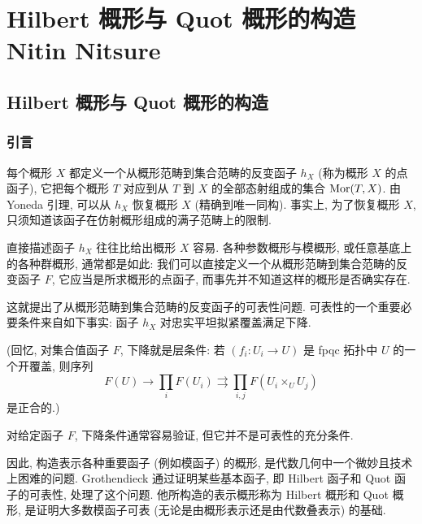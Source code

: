 \providecommand{\chHilb}{\mathcal{H}ilb}
\providecommand{\chQuot}{\mathcal{Q}uot}
\providecommand{\chGrass}{\mathcal{G}rass}
\providecommand{\chProj}{\operatorname{Proj}}
\providecommand{\chSym}{\operatorname{Sym}}
\providecommand{\chGrassScheme}{\operatorname{Grass}}
\providecommand{\chHilbScheme}{\operatorname{Hilb}}
\providecommand{\chQuotScheme}{\operatorname{Quot}}
\part[\parttoc{Hilbert 概形与 Quot 概形的构造}{Nitin Nitsure}]{%
%
Hilbert 概形与 Quot 概形的构造\\[1.5em]{\normalfont\normalsize Nitin Nitsure}}
\chapter{Hilbert 概形与 Quot 概形的构造}\label{ch05}
\section*{引言}
每个概形 $X$ 都定义一个从概形范畴到集合范畴的反变函子 $h_X$ (称为概形 $X$ 的点函子), 它把每个概形 $T$ 对应到从 $T$ 到 $X$ 的全部态射组成的集合 $\operatorname{Mor}(T,X)$. 由 Yoneda 引理, 可以从 $h_X$ 恢复概形 $X$ (精确到唯一同构). 事实上, 为了恢复概形 $X$, 只须知道该函子在仿射概形组成的满子范畴上的限制.

直接描述函子 $h_X$ 往往比给出概形 $X$ 容易. 各种参数概形与模概形, 或任意基底上的各种群概形, 通常都是如此: 我们可以直接定义一个从概形范畴到集合范畴的反变函子 $F$, 它应当是所求概形的点函子, 而事先并不知道这样的概形是否确实存在.

这就提出了从概形范畴到集合范畴的反变函子的可表性问题. 可表性的一个重要必要条件来自如下事实: 函子 $h_X$ 对忠实平坦拟紧覆盖满足下降.

(回忆, 对集合值函子 $F$, 下降就是层条件: 若 $(f_i:U_i\to U)$ 是 fpqc 拓扑中 $U$ 的一个开覆盖, 则序列
\[
 F(U)\longrightarrow\prod_iF(U_i)\rightrightarrows\prod_{i,j}F(U_i\times_U U_j)
\]
是正合的.)

对给定函子 $F$, 下降条件通常容易验证, 但它并不是可表性的充分条件.

因此, 构造表示各种重要函子 (例如模函子) 的概形, 是代数几何中一个微妙且技术上困难的问题. Grothendieck 通过证明某些基本函子, 即 Hilbert 函子和 Quot 函子的可表性, 处理了这个问题. 他所构造的表示概形称为 Hilbert 概形和 Quot 概形, 是证明大多数模函子可表 (无论是由概形表示还是由代数叠表示) 的基础.

